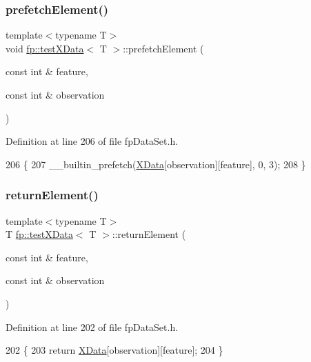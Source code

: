 \subsubsection{\texorpdfstring{prefetch\+Element()}{prefetchElement()}}
{\footnotesize\ttfamily template$<$typename T$>$ \\
void \hyperlink{classfp_1_1testXData}{fp\+::test\+X\+Data}$<$ T $>$\+::prefetch\+Element (\begin{DoxyParamCaption}\item[{const int \&}]{feature,  }\item[{const int \&}]{observation }\end{DoxyParamCaption})\hspace{0.3cm}{\ttfamily [inline]}}



Definition at line 206 of file fp\+Data\+Set.\+h.


\begin{DoxyCode}
206                                                                               \{
207             \_\_builtin\_prefetch(\hyperlink{classfp_1_1testXData_a3a7fe96fa4c950d66be4e9e8faa70e9c}{XData}[observation][feature], 0, 3);
208         \}
\end{DoxyCode}
\mbox{\label{classfp_1_1testXData_af5e145dd37b992a7b15cfc47e74a3cbe}} 
\subsubsection{\texorpdfstring{return\+Element()}{returnElement()}}
{\footnotesize\ttfamily template$<$typename T$>$ \\
T \hyperlink{classfp_1_1testXData}{fp\+::test\+X\+Data}$<$ T $>$\+::return\+Element (\begin{DoxyParamCaption}\item[{const int \&}]{feature,  }\item[{const int \&}]{observation }\end{DoxyParamCaption})\hspace{0.3cm}{\ttfamily [inline]}}



Definition at line 202 of file fp\+Data\+Set.\+h.


\begin{DoxyCode}
202                                                                          \{
203             \textcolor{keywordflow}{return} \hyperlink{classfp_1_1testXData_a3a7fe96fa4c950d66be4e9e8faa70e9c}{XData}[observation][feature];
204         \}
\end{DoxyCode}
\mbox{\label{classfp_1_1testXData_a1be829ef319b4ad983dd5ff2baa042d9}} 

